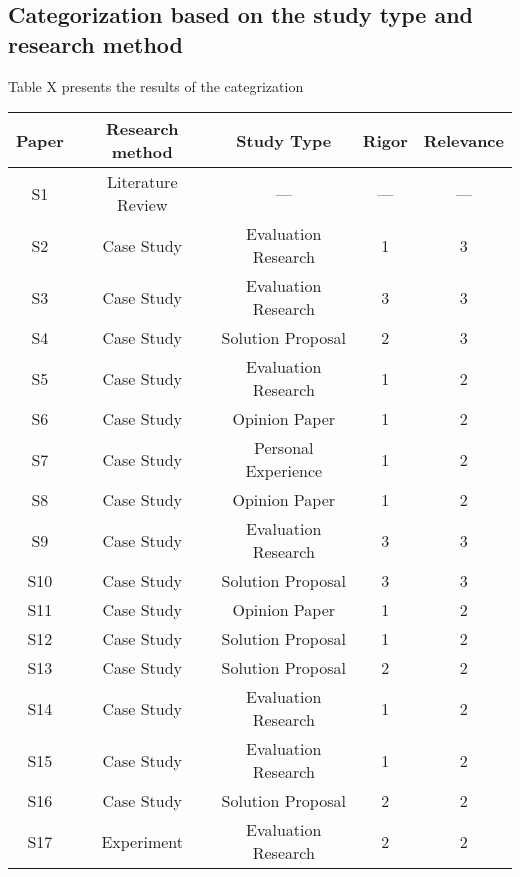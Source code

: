 \documentclass{article}
\begin{document}
\subsection{Categorization based on the study type and research method}\label{ResultsCat}
Table X presents the results of the categrization
\begin{table}[]
    \centering
    \begin{tabular}{c|c|c|c|c}
         Paper   & Research method \cite{runeson2012case} & Study Type \cite{wieringa2006requirements} & Rigor \cite{ivarsson2011method} & Relevance \cite{ivarsson2011method} \\ \hline \hline
        S1     & Literature Review & ---   & ---   & ---  \\
        \hline
        S2     & Case Study & Evaluation Research   & 1 & 3 \\
        \hline
        S3     & Case Study & Evaluation Research & 3 & 3 \\
        \hline
        S4     & Case Study & Solution Proposal  & 2 & 3  \\
        \hline
        S5     & Case Study  & Evaluation Research & 1 & 2 \\
        \hline
        S6     & Case Study & Opinion Paper & 1 & 2  \\
        \hline
        S7     & Case Study & Personal Experience & 1 & 2  \\
        \hline
        S8     & Case Study & Opinion Paper & 1 & 2 \\
        \hline
        S9     & Case Study & Evaluation Research & 3 & 3 \\
        \hline
        S10     & Case Study & Solution Proposal & 3 &  3 \\
        \hline
        S11     &  Case Study & Opinion Paper & 1 & 2  \\
        \hline
        S12     & Case Study & Solution Proposal & 1 & 2 \\
        \hline
        S13     & Case Study & Solution Proposal & 2 & 2 \\
        \hline
        S14     & Case Study & Evaluation Research & 1 & 2 \\
        \hline
        S15     & Case Study & Evaluation Research & 1 & 2 \\
        \hline
        S16     & Case Study & Solution Proposal & 2 & 2 \\
        \hline
        S17     & Experiment & Evaluation Research & 2 & 2 \\

\end{tabular}
\end{table}
\end{document}
